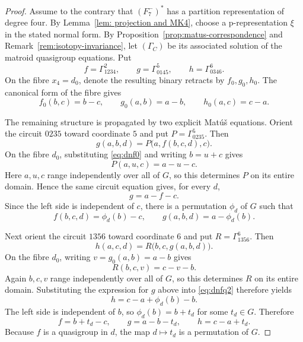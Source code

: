 \documentclass[preprint,12pt]{elsarticle}
\theoremstyle{definition}
\begin{document}
\begin{proof}
Assume to the contrary that $(F_7^-)^*$ has a partition representation of
degree four. By Lemma~\ref{lem: projection and MK4}, choose a
p-representation $\xi$ in the stated normal form. By
Proposition~\ref{prop:matus-correspondence} and
Remark~\ref{rem:isotopy-invariance}, let $(\Gamma_C)$ be its associated solution
of the matroid quasigroup equations. 
Put
\[
f=\Gamma_{1234}^{2},\qquad
g=\Gamma_{0145}^{5},\qquad
h=\Gamma_{0346}^{6}.
\]
On the fibre $x_4=d_0$, denote the resulting binary retracts by
$f_0,g_0,h_0$. The canonical form of the fibre gives
\begin{equation}\label{eq:dnf0}
f_0(b,c)=b-c,\qquad g_0(a,b)=a-b,\qquad h_0(a,c)=c-a.
\end{equation}


The remaining structure is propagated by two explicit Mat\'u\v{s} equations.
Orient the circuit $0235$ toward coordinate $5$ and put
$P=\Gamma_{0235}^{5}$. Then
\begin{equation}\label{eq:dnfq1}
g(a,b,d)=P\bigl(a,f(b,c,d),c\bigr).
\end{equation}
On the fibre $d_0$, substituting \eqref{eq:dnf0} and writing $b=u+c$ gives
\[
P(a,u,c)=a-u-c.
\]
Here $a,u,c$ range independently over all of $G$, so this determines $P$ on its entire domain. Hence the same circuit equation gives, for every $d$,
\[
g=a-f-c.
\]
Since the left side is independent of $c$, there is a permutation $\phi_d$ of $G$ such that
\[
f(b,c,d)=\phi_d(b)-c,\qquad g(a,b,d)=a-\phi_d(b).
\]

Next orient the circuit $1356$ toward coordinate $6$ and put
$R=\Gamma_{1356}^{6}$. Then
\begin{equation}\label{eq:dnfq2}
h(a,c,d)=R\bigl(b,c,g(a,b,d)\bigr).
\end{equation}
On the fibre $d_0$, writing $v=g_0(a,b)=a-b$ gives
\[
R(b,c,v)=c-v-b.
\]
Again $b,c,v$ range independently over all of $G$, so this determines $R$ on
its entire domain. Substituting the expression for $g$ above into
\eqref{eq:dnfq2} therefore yields
\[
h=c-a+\phi_d(b)-b.
\]
The left side is independent of $b$, so $\phi_d(b)=b+t_d$ for some $t_d\in G$. Therefore
\begin{equation}\label{eq:dnfnormal}
f=b+t_d-c,\qquad g=a-b-t_d,\qquad h=c-a+t_d.
\end{equation}
Because $f$ is a quasigroup in $d$, the map $d\mapsto t_d$ is a permutation of $G$.


\end{proof}
\end{document}
